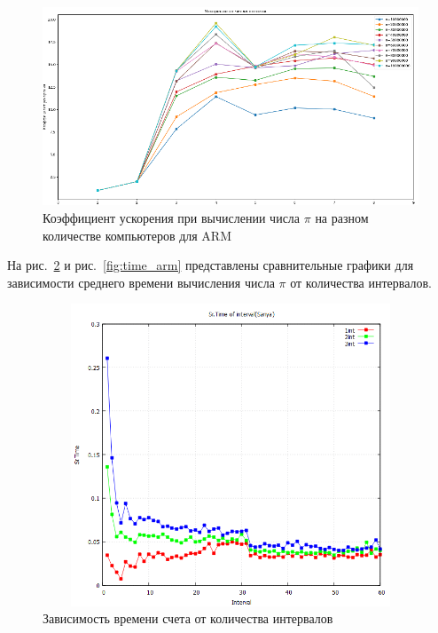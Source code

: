 \documentclass{altsu-bachelor}
\begin{document}
\begin{figure}[H]
    \centering
    \includegraphics[scale=0.8]{images/coeff_arm.png}
    \caption{\centering Коэффициент ускорения при вычислении числа $\pi$ на разном количестве компьютеров для ARM}
    \label{fig:speed_arm}
\end{figure}

На рис.~\ref{fig:time} и рис.~\ref{fig:time_arm} представлены сравнительные графики для зависимости среднего времени вычисления числа $\pi$ от количества интервалов.

\begin{figure}[H]
    \centering
    \includegraphics[width=170mm, height=90mm]{images/avg_time.png}
    \caption{Зависимость времени счета от количества интервалов}
    \label{fig:time}
\end{figure}
\end{document}
